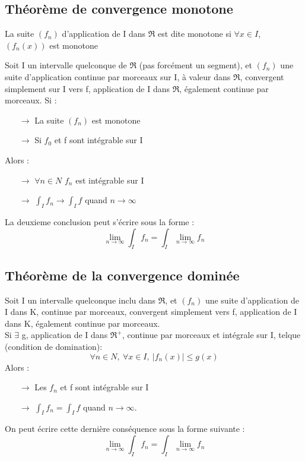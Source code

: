 \subsection{Théorème de convergence monotone}
\begin{de}
La suite $(f_n)$ d'application de I dans $\Re$ est dite monotone si $\forall x \in I$, $(f_n(x))$ est monotone
\end{de}
\begin{theo}
Soit I un intervalle quelconque de $\Re$ (pas forcément un segment), et $(f_n)$ une suite d'application continue par morceaux sur I, à valeur dans $\Re$, convergent simplement sur I vers f, application de I dans $\Re$, également continue par morceaux. Si : \\
\begin{itemize}
 \item[$\rightarrow$] La suite $(f_n)$ est monotone\\
 \item[$\rightarrow$] Si $f_0$ et f sont intégrable sur I\\
\end{itemize}
Alors : \\
\begin{itemize}
 \item[$\rightarrow$] $\forall n \in N$ $f_n$ est intégrable sur I
 \item[$\rightarrow$] $\int_I f_n \rightarrow \int_I f$ quand $n\rightarrow\infty$
\end{itemize}
La deuxieme conclusion peut s'écrire sous la forme : 
$$\lim_{n\rightarrow\infty} \int_I f_n = \int_I \lim_{n\rightarrow\infty} f_n$$
\end{theo}
\subsection{Théorème de la convergence dominée}
\begin{theo}
Soit I un intervalle quelconque inclu dans $\Re$, et $(f_n)$ une suite d'application de I dans K, continue par morceaux, convergent simplement vers f, application de I dans K, également continue par morceaux.\\
Si $\exists$ g, application de I dans $\Re^+$, continue par morceaux et intégrale sur I, telque (condition de domination): 
$$\forall n \in N,~ \forall x \in I,~ |f_n(x)|\leq g(x)$$
Alors :\\ 
\begin{itemize}
 \item[$\rightarrow$] Les $f_n$ et f sont intégrable sur I
 \item[$\rightarrow$] $\int_I f_n = \int_I f$ quand $n \rightarrow \infty$.
\end{itemize}
On peut écrire cette dernière conséquence sous la forme suivante : 
$$\lim_{n \rightarrow \infty} \int_I f_n = \int_I \lim_{n \rightarrow\infty} f_n$$
\end{theo}